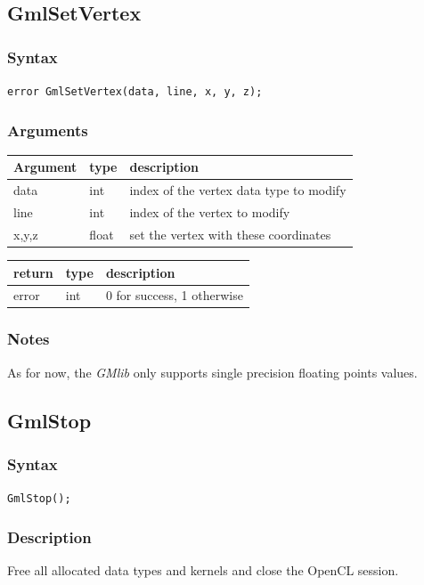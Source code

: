 \documentclass[a4paper,12pt]{article}
\begin{document}
\subsection{GmlSetVertex}
\subsubsection*{Syntax}
{\tt error GmlSetVertex(data, line, x, y, z);}
\subsubsection*{Arguments}

\begin{tabular}{|m{2cm}|m{1.5cm}|m{10.5cm}|}
\hline
Argument   & type   & description \\
\hline
data       & int    & index of the vertex data type to modify \\
\hline
line       & int    & index of the vertex to modify \\
\hline
x,y,z      & float  & set the vertex with these coordinates \\
\hline
\end{tabular}

\medskip

\begin{tabular}{|m{2cm}|m{1.5cm}|m{10.5cm}|}
\hline
return     & type   & description \\
\hline
error     & int    & 0 for success, 1 otherwise \\
\hline
\end{tabular}
\subsubsection*{Notes}
As for now, the \emph{GMlib} only supports single precision floating points values.


\subsection{GmlStop}
\subsubsection*{Syntax}

{\tt GmlStop();}
\subsubsection*{Description}

Free all allocated data types and kernels and close the OpenCL session.
\end{document}
